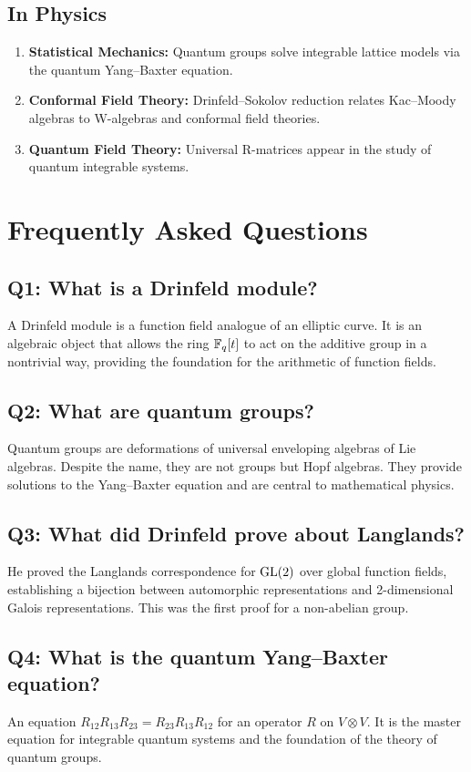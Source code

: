 \subsection{In Physics}

\begin{enumerate}
    \item \textbf{Statistical Mechanics:} Quantum groups solve integrable lattice models via the quantum Yang--Baxter equation.
    \item \textbf{Conformal Field Theory:} Drinfeld--Sokolov reduction relates Kac--Moody algebras to W-algebras and conformal field theories.
    \item \textbf{Quantum Field Theory:} Universal R-matrices appear in the study of quantum integrable systems.
\end{enumerate}

\section{Frequently Asked Questions}

\subsection*{Q1: What is a Drinfeld module?}
A Drinfeld module is a function field analogue of an elliptic curve. It is an algebraic object that allows the ring $\mathbb{F}_q[t]$ to act on the additive group in a nontrivial way, providing the foundation for the arithmetic of function fields.

\subsection*{Q2: What are quantum groups?}
Quantum groups are deformations of universal enveloping algebras of Lie algebras. Despite the name, they are not groups but Hopf algebras. They provide solutions to the Yang--Baxter equation and are central to mathematical physics.

\subsection*{Q3: What did Drinfeld prove about Langlands?}
He proved the Langlands correspondence for $\operatorname{GL}(2)$ over global function fields, establishing a bijection between automorphic representations and 2-dimensional Galois representations. This was the first proof for a non-abelian group.

\subsection*{Q4: What is the quantum Yang--Baxter equation?}
An equation $R_{12} R_{13} R_{23} = R_{23} R_{13} R_{12}$ for an operator $R$ on $V \otimes V$. It is the master equation for integrable quantum systems and the foundation of the theory of quantum groups.

